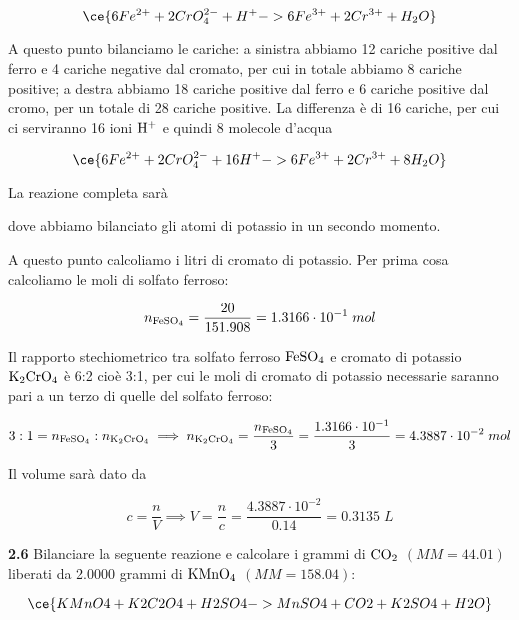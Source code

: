 $$\ce{6Fe^{2+} + 2CrO_4^{2-} + H^+ -> 6Fe^{3+} + 2Cr^{3+} + H_2O}$$

A questo punto bilanciamo le cariche: a sinistra abbiamo 12 cariche positive dal ferro e 4 cariche negative dal cromato, per cui in totale abbiamo 8 cariche positive; a destra abbiamo 18 cariche positive dal ferro e 6 cariche positive dal cromo, per un totale di 28 cariche positive. La differenza è di 16 cariche, per cui ci serviranno 16 ioni $\rm H^+$ e quindi 8 molecole d'acqua

$$\ce{6Fe^{2+} + 2CrO_4^{2-} + 16H^+ -> 6Fe^{3+} + 2Cr^{3+} + 8H_2O}$$

La reazione completa sarà

\begin{center}



\end{center}

dove abbiamo bilanciato gli atomi di potassio in un secondo momento.


A questo punto calcoliamo i litri di cromato di potassio. Per prima cosa calcoliamo le moli di solfato ferroso:

$$n_{\rm FeSO_4}=\frac{20}{151.908}
=1.3166 \cdot 10^{-1}\;mol$$

Il rapporto stechiometrico tra solfato ferroso $\rm FeSO_4$ e cromato di potassio $\rm K_2CrO_4$ è 6:2 cioè 3:1, per cui le moli di cromato di potassio necessarie saranno pari a un terzo di quelle del solfato ferroso:

$$3:1=n_{\rm FeSO_4}:n_{\rm K_2CrO_4}
\implies
n_{\rm K_2CrO_4}=\frac{n_{\rm FeSO_4}}{3}
=\frac{1.3166 \cdot 10^{-1}}{3}
=4.3887 \cdot 10^{-2}\;mol$$

Il volume sarà dato da

$$c=\frac{n}{V}
\implies
V=\frac{n}{c}
=\frac{4.3887 \cdot 10^{-2}}{0.14}=0.3135\;L$$

\vspace{0.2cm}\textbf{2.6} Bilanciare la seguente reazione e calcolare i grammi di $\rm CO_2$ $(MM=44.01)$ liberati da 2.0000 grammi di $\rm KMnO_4$ $(MM=158.04)$:

$$\ce{KMnO4 + K2C2O4 + H2SO4 -> MnSO4 + CO2 + K2SO4 + H2O}$$

